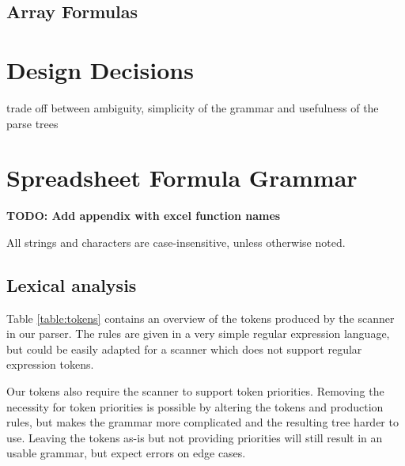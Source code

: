 \documentclass[conference]{IEEEtran}
\newcommand{\todo}[1]{\textbf{TODO: #1}}
\begin{document}
\subsection{Array Formulas}

\section{Design Decisions}
trade off between ambiguity, simplicity of the grammar and usefulness of the parse trees

\section{Spreadsheet Formula Grammar}
\label{section:grammar}

\todo{Add appendix with excel function names}

All strings and characters are case-insensitive, unless otherwise noted.

\subsection{Lexical analysis}

Table \ref{table:tokens} contains an overview of the tokens produced by the scanner in our parser. The rules are given in a very simple regular expression language, but could be easily adapted for a scanner which does not support regular expression tokens. 

Our tokens also require the scanner to support token priorities. Removing the necessity for token priorities is possible by altering the tokens and production rules, but makes the grammar more complicated and the resulting tree harder to use. Leaving the tokens as-is but not providing priorities will still result in an usable grammar, but expect errors on edge cases.
\end{document}
